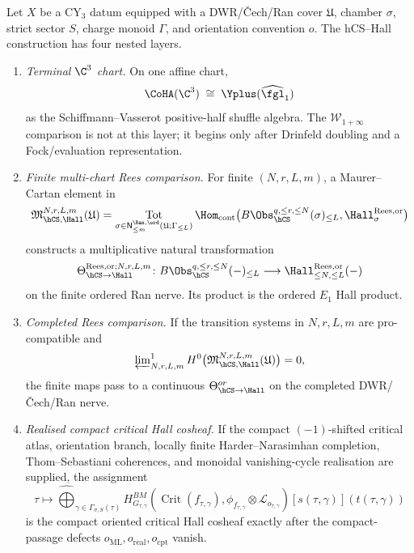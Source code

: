 \begin{proposition}
\label{gluing:prop:four-hcs-hall-layers}
Let \(X\) be a CY$_3$ datum equipped with a DWR/\v{C}ech/Ran cover
\(\mathfrak U\), chamber \(\sigma\), strict sector \(S\), charge monoid
\(\Gamma\), and orientation convention \(o\). The hCS--Hall
construction has four nested layers.
\begin{enumerate}[label=\textup{(\roman*)}]
\item \emph{Terminal \(\C^3\) chart.} On one affine chart,
\[
 \CoHA(\C^3)\;\cong\;\Yplus(\widehat{\fgl}_1)
\]
as the Schiffmann--Vasserot positive-half shuffle algebra. The
\(\mathcal W_{1+\infty}\) comparison is not at this layer; it begins
only after Drinfeld doubling and a Fock/evaluation representation.
\item \emph{Finite multi-chart Rees comparison.} For finite
\((N,r,L,m)\), a Maurer--Cartan element in
\[
 \mathfrak M_{\hCS,\Hall}^{N,r,L,m}(\mathfrak U)
 =
 \operatorname*{Tot}_{\sigma\in
 \mathsf N^{\Ran,\ord}_{\le m}(\mathfrak U;\Gamma_{\le L})}
 \Hom_{\mathrm{cont}}
 \bigl(B\Obs_{\hCS}^{q,\le r,\le N}(\sigma)_{\le L},
 \Hall_{\sigma}^{\mathrm{Rees},\mathrm{or}}\bigr)
\]
constructs a multiplicative natural transformation
\[
 \Theta_{\hCS\to\Hall}^{\mathrm{Rees},\mathrm{or};N,r,L,m}
 \colon
 B\Obs_{\hCS}^{q,\le r,\le N}(-)_{\le L}
 \longrightarrow
 \Hall^{\mathrm{Rees},\mathrm{or}}_{\le N,\le L}(-)
\]
on the finite ordered Ran nerve. Its product is the ordered
\(E_1\) Hall product.
\item \emph{Completed Rees comparison.} If the transition systems in
\(N,r,L,m\) are pro-compatible and
\[
 \varprojlim\nolimits^1_{N,r,L,m}
 H^0\bigl(\mathfrak M_{\hCS,\Hall}^{N,r,L,m}(\mathfrak U)\bigr)=0,
\]
the finite maps pass to a continuous
\(\Theta^{or}_{\hCS\to\Hall}\) on the completed DWR/\v{C}ech/Ran
nerve.
\item \emph{Realised compact critical Hall cosheaf.} If the compact
\((-1)\)-shifted critical atlas, orientation branch, locally finite
Harder--Narasimhan completion, Thom--Sebastiani coherences, and
monoidal vanishing-cycle realisation are supplied, the assignment
\[
 \tau\longmapsto
 \widehat{\bigoplus}_{\gamma\in\Gamma_{\sigma,S}(\tau)}
 H^{BM}_{G_{\tau,\gamma}}
 \!\left(
 \operatorname{Crit}(f_{\tau,\gamma}),
 \phi_{f_{\tau,\gamma}}\otimes\mathscr L_{o_{\tau,\gamma}}
 \right)[s(\tau,\gamma)](t(\tau,\gamma))
\]
is the compact oriented critical Hall cosheaf exactly after the
compact-passage defects
$o_{\mathrm{ML}},o_{\mathrm{real}},o_{\mathrm{cpt}}$ vanish.
\end{enumerate}

\end{proposition}
